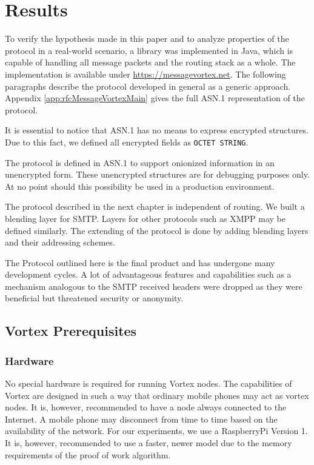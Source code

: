 
\part{Results\label{sec:results}}
To verify the hypothesis made in this paper and to analyze properties of the protocol in a real-world scenario, a library was implemented in Java, which is capable of handling all message packets and the routing stack as a whole. The implementation is available under \url{https://messagevortex.net}. The following paragraphs describe the protocol developed in general as a generic approach. Appendix \ref{app:rfcMessageVortexMain} gives the full ASN.1 representation of the protocol. 

It is essential to notice that ASN.1 has no means to express encrypted structures. Due to this fact, we defined all encrypted fields as \verb|OCTET STRING|. 

The protocol is defined in ASN.1 to support onionized information in an unencrypted form. These unencrypted structures are for debugging purposes only. At no point should this possibility be used in a production environment.

The protocol described in the next chapter is independent of routing. We built a blending layer for SMTP. Layers for other protocols such as XMPP may be defined similarly. The extending of the protocol is done by adding blending layers and their addressing schemes.

The Protocol outlined here is the final product and has undergone many development cycles. A lot of advantageous features and capabilities such as a mechanism analogous to the SMTP received headers were dropped as they were beneficial but threatened security or anonymity.

\chapter{Vortex Prerequisites}
\section{Hardware}
No special hardware is required for running Vortex nodes. The capabilities of Vortex are designed in such a way that ordinary mobile phones may act as vortex nodes. It is, however, recommended to have a node always connected to the Internet. A mobile phone may disconnect from time to time based on the availability of the network. For our experiments, we use a RaspberryPi Version 1. It is, however, recommended to use a faster, newer model due to the memory requirements of the proof of work algorithm.

